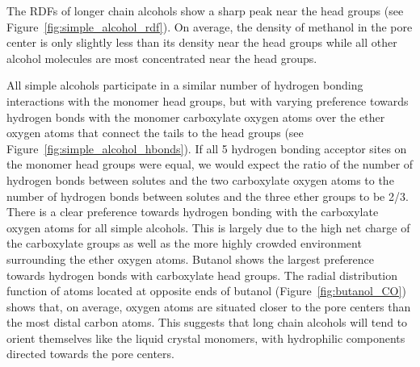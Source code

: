 \documentclass[journal=jpcbfk,manuscript=article]{achemso}
\begin{document}
  The RDFs of longer chain alcohols show a sharp peak near the head groups 
  (see Figure~\ref{fig:simple_alcohol_rdf}). On average, the density of methanol
  in the pore center is only slightly less than its density near the head 
  groups while all other alcohol molecules are most concentrated near the head
  groups.
  
  
  All simple alcohols participate in a similar number of hydrogen bonding 
  interactions with the monomer head groups, but with varying preference towards
  hydrogen bonds with the monomer carboxylate oxygen atoms over the ether oxygen
  atoms that connect the tails to the head groups (see Figure~\ref{fig:simple_alcohol_hbonds}).
  If all 5 hydrogen bonding acceptor sites on the monomer head groups were equal,
  we would expect the ratio of the number of hydrogen bonds between solutes and
  the two carboxylate oxygen atoms to the number of hydrogen bonds between solutes
  and the three ether groups to be 2/3. There is a clear preference towards 
  hydrogen bonding with the carboxylate oxygen atoms for all simple alcohols. 
  This is largely due to the high net charge of the carboxylate groups as well
  as the more highly crowded environment surrounding the ether oxygen atoms. 
  Butanol shows the largest preference towards hydrogen bonds with carboxylate
  head groups. The radial distribution function of atoms located at opposite ends
  of butanol (Figure~\ref{fig:butanol_CO}) shows that, on average, oxygen atoms are situated closer to the pore
  centers than the most distal carbon atoms. This suggests that long chain alcohols
  will tend to orient themselves like the liquid crystal monomers, with hydrophilic components
  directed towards the pore centers.
  
\end{document}

